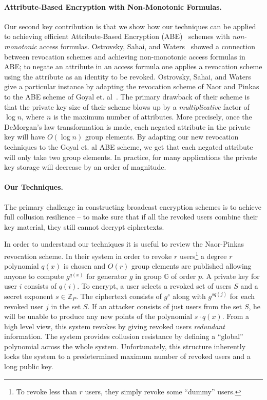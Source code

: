 \documentclass[a4paper, 11pt]{article}
\newcommand{\Z}{\ensuremath{\mathbb{Z}}}
\newcommand{\G}{\ensuremath{\mathbb{G}}}
\theoremstyle{definition}
\begin{document}
\paragraph{Attribute-Based Encryption with Non-Monotonic Formulas.}
Our second key contribution is that we show how our techniques can be
applied to achieving efficient Attribute-Based Encryption
(ABE)~\cite{sw05} schemes with \emph{non-monotonic} access
formulas. Ostrovsky, Sahai, and Waters~\cite{OSW07} showed a
connection between revocation schemes and achieving
non-monotonic access formulas in ABE; to negate an attribute in an
access formula one applies a revocation scheme using the attribute as
an identity to be revoked. Ostrovsky, Sahai, and Waters give a
particular instance by adapting the revocation scheme of Naor and
Pinkas~\cite{NP01} to the ABE scheme of Goyal
et. al~\cite{GPSW06}. The primary drawback of their scheme is that the
private key size of their scheme blows up by a \emph{multiplicative}
factor of $\log n$, where $n$ is the maximum number of
attributes. More precisely, once the DeMorgan's law transformation is
made, each negated attribute in the private key will have $O(\log n)$
group elements. By adapting our new revocation techniques to the Goyal
et. al ABE scheme, we get that each negated attribute will only take two group
elements. In practice, for many applications the private key storage
will decrease by an order of magnitude.


\paragraph{Our Techniques.}
The primary challenge in constructing broadcast encryption schemes is
to achieve full collusion resilience -- to make sure that if all the
revoked users combine their key material, they still cannot
decrypt ciphertexts.

In order to understand our techniques it is useful to review the
Naor-Pinkas~\cite{NP01} revocation scheme. In their system in order to
revoke $r$ users\footnote{To revoke less than $r$ users, they simply
revoke some ``dummy'' users.} a degree $r$ polynomial $q(x)$ is chosen
and $O(r)$ group elements are published allowing anyone to compute
$g^{q(x)}$ for generator $g$ in group $\G$ of order $p$. A private key
for user $i$ consists of $q(i)$. To encrypt, a user selects a revoked
set of users $S$ and a secret exponent $s \in \Z_P$. The ciphertext
consists of $g^s$ along with $g^{s q(j)}$ for each revoked user $j$ in the
set $S$. If an attacker consists of just users from the set $S$, he will
be unable to produce any new points of the polynomial $s\cdot q(x)$. From a high level view, this system revokes by giving
revoked users \emph{redundant} information. The system provides collusion
resistance by defining a ``global'' polynomial across the whole system.
Unfortunately, this structure inherently locks the system to a predetermined
maximum number of revoked users and a long public key.
\end{document}
